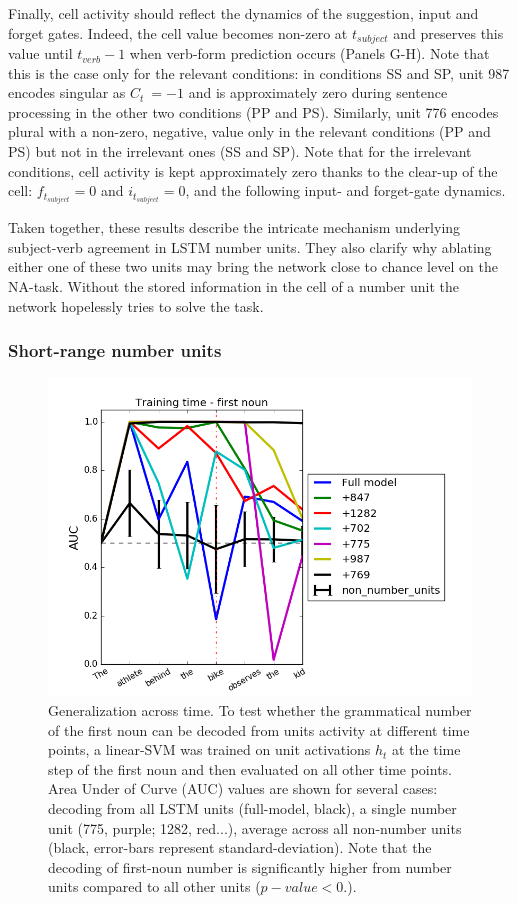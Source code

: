 Finally, cell activity should reflect the dynamics of the suggestion, input and forget gates. Indeed, the cell value becomes non-zero at $t_{subject}$ and preserves this value until $t_{verb}-1$ when verb-form prediction occurs (Panels G-H). Note that this is the case only for the relevant conditions: in conditions SS and SP, unit 987 encodes singular as $C_t ~= -1$ and is approximately zero during sentence processing in the other two conditions (PP and PS). Similarly, unit 776 encodes plural with a non-zero, negative, value only in the relevant conditions (PP and PS) but not in the irrelevant ones (SS and SP). Note that for the irrelevant conditions, cell activity is kept approximately zero thanks to the clear-up of the cell: $f_{t_{subject}}=0$ and $i_{t_{subject}}=0$, and the following input- and forget-gate dynamics.

Taken together, these results describe the intricate mechanism underlying subject-verb agreement in LSTM number units. They also clarify why ablating either one of these two units may bring the network close to chance level on the NA-task. Without the stored information in the cell of a number unit the network hopelessly tries to solve the task.


\subsubsection{Short-range number units}
\lipsum[1]

\begin{figure}
\centering
\includegraphics[width=\linewidth]{Figures/Figure3_number_units_GAT.png}
\caption{Generalization across time. To test whether the grammatical number of the first noun can be decoded from units activity at different time points, a linear-SVM was trained on unit activations $h_t$ at the time step of the first noun and then evaluated on all other time points. Area Under of Curve (AUC) values are shown for several cases: decoding from all LSTM units (full-model, black), a single number unit (775, purple; 1282, red...), average across all non-number units (black, error-bars represent standard-deviation). Note that the decoding of first-noun number is significantly higher from number units compared to all other units ($p-value<0.$).}
\end{figure}


